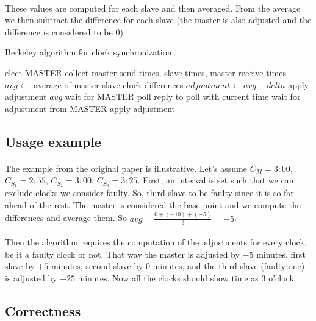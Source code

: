 \documentclass[12pt]{article}
\begin{document}
\paragraph{}
These values are computed for each slave and then averaged. From the average we then subtract the difference for each slave (the master is also adjusted and the difference is considered to be 0).

\begin{algorithm}
\caption{Berkeley algorithm for clock synchronization}
\begin{algorithmic}[1]
	\State elect MASTER
		\State collect master send times, slave times, master receive times
		\State $avg \gets $ average of master-slave clock differences
		\State $adjustment \gets avg-delta$
		\State apply adjustment $avg$
		\State wait for MASTER poll
		\State reply to poll with current time
		\State wait for adjustment from MASTER
		\State apply adjustment
	\EndIf
\end{algorithmic}
\end{algorithm}

\subsection{Usage example}
\paragraph{}
The example from the original paper is illustrative. Let's assume $C_{M} = 3:00$, $C_{S_{1}} = 2:55$, $C_{S_{2}} = 3:00$, $C_{S_{3}} = 3:25$. First, an interval is set such that we can exclude clocks we consider faulty. So, third slave to be faulty since it is so far ahead of the rest. The master is considered the base point and we compute the differences and average them. So $avg=\frac{0 + (-10) + (-5)}{3} = -5$. 

\paragraph{}
Then the algorithm requires the computation of the adjustments for every clock, be it a faulty clock or not. That way the master is adjusted by $-5$ minutes, first slave by $+5$ minutes, second slave by $0$ minutes, and the third slave (faulty one) is adjusted by $-25$ minutes. Now all the clocks should show time as 3 o'clock.

\subsection{Correctness}
\end{document}
